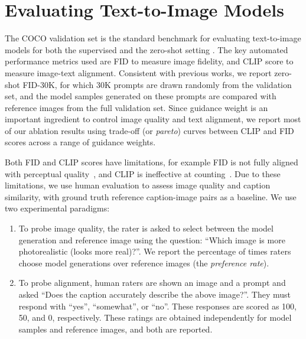 


\vspace{\presectionspace}
\section{Evaluating Text-to-Image Models}
\vspace{\postsectionspace}




The COCO \cite{lin-eccv-2014} validation set is the standard benchmark for evaluating text-to-image models for both the supervised \cite{zhou2021lafite, gafni2022make} and the zero-shot setting \cite{ramesh-dalle, nichol-glide}. The key automated performance metrics used are FID \cite{heusel2017gans} to measure image fidelity, and CLIP score \cite{hessel2021clipscore, radford-icml-2021} to measure image-text alignment. Consistent with previous works, we report zero-shot FID-30K, for which 30K prompts are drawn randomly from the validation set, and the model samples generated on these prompts are compared with reference images from the full validation set. Since guidance weight is an important ingredient to control image quality and text alignment, we report most of our ablation results using trade-off (or \textit{pareto}) curves between CLIP and FID scores across a range of guidance weights. 

Both FID and CLIP scores have limitations, for example FID is not fully aligned with perceptual quality~\cite{parmar-cvpr-2022}, and CLIP is ineffective at counting~\cite{radford-icml-2021}. Due to these limitations, we use human evaluation to assess image quality and caption similarity, with ground truth reference caption-image pairs as a baseline. We use two experimental paradigms:
\begin{enumerate}[noitemsep,nolistsep,leftmargin=0.5cm]
    \item To probe image quality, the rater is asked to select between the model generation and reference image using the question: ``Which image is more photorealistic (looks more real)?''. We report the percentage of times raters choose model generations over reference images (the \emph{preference rate}). 
    
    \item To probe alignment, human raters are shown an image and a prompt and asked ``Does the caption accurately describe the above image?''. They must respond with ``yes'', ``somewhat'', or ``no''. These responses are scored as 100, 50, and 0, respectively. These ratings are obtained independently for model samples and  reference images, and both are reported.
\end{enumerate}

